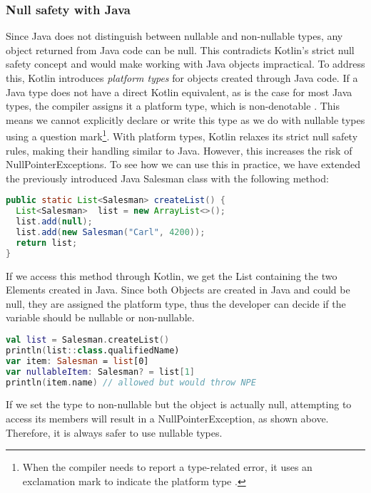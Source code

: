 \documentclass[a4paper,11pt]{article}
\begin{document}
\subsubsection{Null safety with Java}
Since Java does not distinguish between nullable and non-nullable types, any object returned from Java code can be null. This contradicts Kotlin's strict null safety concept and would make working with Java objects impractical.
To address this, Kotlin introduces \textit{platform types} for objects created through Java code. If a Java type does not have a direct Kotlin equivalent, as is the case for most Java types, the compiler assigns it a platform type, which is non-denotable \cite{interop-null-safety}. This means we cannot explicitly declare or write this type as we do with nullable types using a question mark\footnote{When the compiler needs to report a type-related error, it uses an exclamation mark to indicate the platform type \cite{interop-platform-notation}.}. With platform types, Kotlin relaxes its strict null safety rules, making their handling similar to Java. However, this increases the risk of NullPointerExceptions.
To see how we can use this in practice, we have extended the previously introduced Java Salesman class with the following method:
\begin{lstlisting}[language=Java]
public static List<Salesman> createList() {
  List<Salesman>  list = new ArrayList<>();
  list.add(null);
  list.add(new Salesman("Carl", 4200));
  return list;
}
\end{lstlisting}
If we access this method through Kotlin, we get the List containing the two Elements created in Java. Since both Objects are created in Java and could be null, they are assigned the platform type, thus the developer can decide if the variable should be nullable or non-nullable.
\begin{lstlisting}[language=Kotlin]  
val list = Salesman.createList()
println(list::class.qualifiedName)
var item: Salesman = list[0]
var nullableItem: Salesman? = list[1]
println(item.name) // allowed but would throw NPE
\end{lstlisting}
If we set the type to non-nullable but the object is actually null, attempting to access its members will result in a NullPointerException, as shown above. Therefore, it is always safer to use nullable types.
\end{document}
